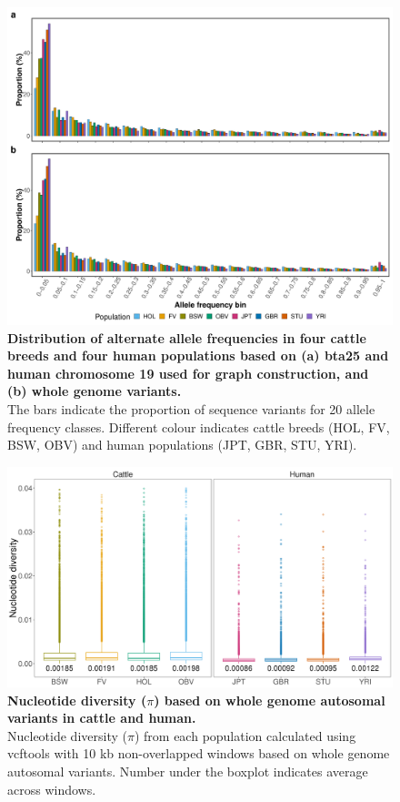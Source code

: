 \documentclass[../main.tex]{subfiles}
\begin{document}
\begin{flushleft}
\newpage

\begin{figure}[!htb]
    \centering
    \includegraphics[width=\textwidth]{paper2/supplement/sp34.pdf}
    \caption[Distribution of alternate allele frequencies]{\textbf{Distribution of alternate allele frequencies in four cattle breeds and
    four human populations based on (a) bta25 and human chromosome 19 used
    for graph construction, and (b) whole genome variants. } \\
    \small{The bars indicate the proportion of sequence variants for 20 allele frequency
    classes. Different colour indicates cattle breeds (HOL, FV, BSW, OBV) and human
    populations (JPT, GBR, STU, YRI).}}
    \label{sup_fig:s34}
\end{figure}

\newpage


\begin{figure}[!htb]
    \centering
    \includegraphics[width=\textwidth]{paper2/supplement/sp35.png}
    \caption[Nucleotide diversity ($\pi$) ]{\textbf{Nucleotide diversity ($\pi$) based on whole genome autosomal variants
    in cattle and human. } \\
    \small{Nucleotide diversity ($\pi$) from each population calculated using vcftools with 10 kb
    non-overlapped windows based on whole genome autosomal variants. Number
    under the boxplot indicates average across windows.}}
    \label{sup_fig:s35}
\end{figure}


\end{flushleft}
\end{document}

